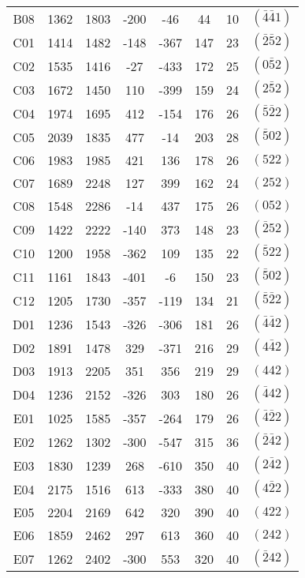 \begin{table}[H]
\begin{tabular}{c|c|c|c|c|c|c|c}
        B08 & 1362 & 1803 & -200 &  -46 &  44 & 10 & $(\bar{4}\bar{4}1)$ \\
        C01 & 1414 & 1482 & -148 & -367 & 147 & 23 & $(\bar{2}\bar{5}2)$ \\
        C02 & 1535 & 1416 &  -27 & -433 & 172 & 25 & $(0\bar{5}2)$ \\
        C03 & 1672 & 1450 &  110 & -399 & 159 & 24 & $(2\bar{5}2)$ \\
        C04 & 1974 & 1695 &  412 & -154 & 176 & 26 & $(\bar{5}\bar{2}2)$ \\
        C05 & 2039 & 1835 &  477 &  -14 & 203 & 28 & $(\bar{5}02)$ \\
        C06 & 1983 & 1985 &  421 &  136 & 178 & 26 & $(522)$ \\
        C07 & 1689 & 2248 &  127 &  399 & 162 & 24 & $(252)$ \\
        C08 & 1548 & 2286 &  -14 &  437 & 175 & 26 & $(052)$ \\
        C09 & 1422 & 2222 & -140 &  373 & 148 & 23 & $(\bar{2}52)$ \\
        C10 & 1200 & 1958 & -362 &  109 & 135 & 22 & $(\bar{5}22)$ \\
        C11 & 1161 & 1843 & -401 &   -6 & 150 & 23 & $(\bar{5}02)$ \\
        C12 & 1205 & 1730 & -357 & -119 & 134 & 21 & $(\bar{5}\bar{2}2)$ \\
        D01 & 1236 & 1543 & -326 & -306 & 181 & 26 & $(\bar{4}\bar{4}2)$ \\
        D02 & 1891 & 1478 &  329 & -371 & 216 & 29 & $(4\bar{4}2)$ \\
        D03 & 1913 & 2205 &  351 &  356 & 219 & 29 & $(442)$ \\
        D04 & 1236 & 2152 & -326 &  303 & 180 & 26 & $(\bar{4}42)$ \\
        E01 & 1025 & 1585 & -357 & -264 & 179 & 26 & $(\bar{4}\bar{2}2)$ \\
        E02 & 1262 & 1302 & -300 & -547 & 315 & 36 & $(\bar{2}\bar{4}2)$ \\
        E03 & 1830 & 1239 &  268 & -610 & 350 & 40 & $(2\bar{4}2)$ \\
        E04 & 2175 & 1516 &  613 & -333 & 380 & 40 & $(4\bar{2}2)$ \\
        E05 & 2204 & 2169 &  642 &  320 & 390 & 40 & $(422)$ \\
        E06 & 1859 & 2462 &  297 &  613 & 360 & 40 & $(242)$ \\
        E07 & 1262 & 2402 & -300 &  553 & 320 & 40 & $(\bar{2}42)$ \\

\end{tabular}
\end{table}
